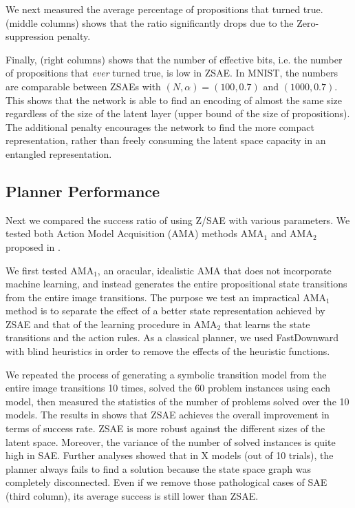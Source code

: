 We next measured the average percentage of propositions that turned true.
 (middle columns) shows that the ratio significantly drops due to the Zero-suppression penalty.

Finally,  (right columns) shows that the number of effective bits,
i.e. the number of propositions that \emph{ever} turned true, is low in ZSAE.
In MNIST, the numbers are comparable between ZSAEs with $(N,\alpha)=(100,0.7)$ and $(1000,0.7)$.
This shows that the network is able to find an encoding of almost the same size
regardless of the size of the latent layer (upper bound of the size of
propositions). The additional
penalty encourages the network to find the more compact representation,
rather than freely consuming the latent space capacity in an entangled representation.


\subsection{Planner Performance}

Next we compared the success ratio of \latentplanner using Z/SAE with various parameters.
We tested both Action Model Acquisition (AMA) methods AMA$_1$ and AMA$_2$ proposed in \cite{Asai2018}.

We first tested AMA$_1$, an oracular, idealistic AMA that does not incorporate machine learning,
and instead generates the entire propositional state transitions from the entire image transitions.
The purpose we test an impractical AMA$_1$ method is
to separate the effect of a better state representation achieved by ZSAE
and that of the learning procedure in AMA$_2$ that learns the state transitions and the action rules.
As a classical planner, we used FastDownward \cite{Helmert04} with blind heuristics in order to
remove the effects of the heuristic functions.

We repeated the process of generating a symbolic transition model from the entire image transitions 10 times,
solved the 60 problem instances using each model,
then measured the statistics of the number of problems solved over the 10 models.
The results in  shows that ZSAE achieves the overall improvement in terms of success rate.
ZSAE is more robust against the different sizes of the latent space.
Moreover, the variance of the number of solved instances is quite high in SAE.
% 
Further analyses showed that
in X models (out of 10 trials), the planner always fails to find a solution because
the state space graph was completely disconnected.
% 
Even if we remove those pathological cases of SAE (third column), its average success is still
lower than ZSAE.

